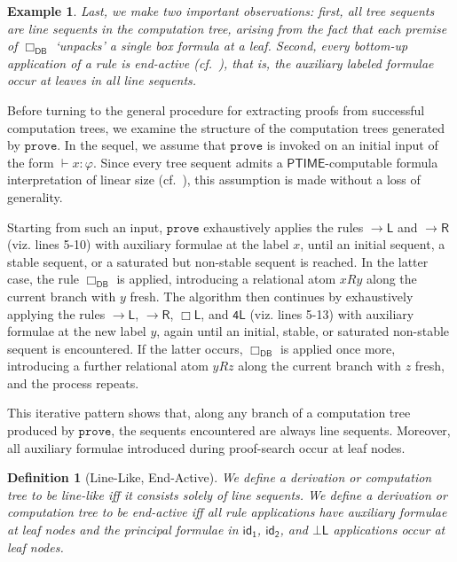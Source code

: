 \documentclass[copyright,creativecommons]{eptcs}
\newtheorem{definition}[theorem]{Definition}
\newtheorem{example}[theorem]{Example}
\newcommand{\idi}{\mathsf{id_{1}}}
\newcommand{\idii}{\mathsf{id_{2}}}
\newcommand{\boxl}{\Box\mathsf{L}}
\newcommand{\fourru}{\mathsf{4L}}
\newcommand{\iffi}{\textit{iff} }
\renewcommand{\phi}{\varphi}
\newcommand{\sar}{\vdash}
\newcommand{\prove}{\mathtt{prove}}
\newcommand{\ndrule}{\Box_\mathsf{DB}}
\newcommand{\ptime}{\mathsf{PTIME}}
\newcommand{\impl}{{\rightarrow}\mathsf{L}}
\newcommand{\impr}{{\rightarrow}\mathsf{R}}
\newcommand{\botl}{\bot\mathsf{L}}
\begin{document}
\begin{example}
Last, we make two important observations: first, all tree sequents are \emph{line sequents} in the computation tree, arising from the fact that each premise of $\ndrule$ `unpacks' a single box formula at a leaf. Second, every bottom-up application of a rule is \emph{end-active} (cf.~\cite{Lel15}), that is, the auxiliary labeled formulae occur at leaves in all line sequents.
\end{example}

Before turning to the general procedure for extracting proofs from successful computation trees, we examine the structure of the computation trees generated by $\prove$. In the sequel, we assume that $\prove$ is invoked on an initial input of the form $\sar x : \phi$. Since every tree sequent admits a $\ptime$-computable formula interpretation of linear size (cf.~\cite{Pog09b}), this assumption is made without a loss of generality.


Starting from such an input, $\prove$ exhaustively applies the rules $\impl$ and $\impr$ (viz. lines 5-10) with auxiliary formulae at the label $x$, until an initial sequent, a stable sequent, or a saturated but non-stable sequent is reached. In the latter case, the rule $\ndrule$ is applied, introducing a relational atom $xRy$ along the current branch with $y$ fresh. The algorithm then continues by exhaustively applying the rules $\impl$, $\impr$, $\boxl$, and $\fourru$ (viz. lines 5-13) with auxiliary formulae at the new label $y$, again until an initial, stable, or saturated non-stable sequent is encountered. If the latter occurs, $\ndrule$ is applied once more, introducing a further relational atom $yRz$ along the current branch with $z$ fresh, and the process repeats.

This iterative pattern shows that, along any branch of a computation tree produced by $\prove$, the sequents encountered are always line sequents. Moreover, all auxiliary formulae introduced during proof-search occur at leaf nodes.

\begin{definition}[Line-Like, End-Active] We define a derivation or computation tree to be \emph{line-like} \iffi it consists solely of line sequents. We define a derivation or computation tree to be \emph{end-active} \iffi all rule applications have auxiliary formulae at leaf nodes and the principal formulae in $\idi$, $\idii$, and $\botl$ applications occur at leaf nodes.
\end{definition}

\end{document}
